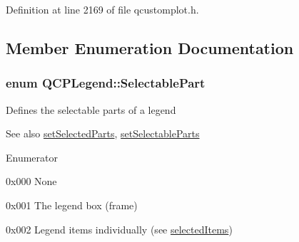Definition at line 2169 of file qcustomplot.\+h.



\subsection{Member Enumeration Documentation}
\hypertarget{class_q_c_p_legend_a5404de8bc1e4a994ca4ae69e2c7072f1}{}
\subsubsection[{Selectable\+Part}]{\setlength{\rightskip}{0pt plus 5cm}enum {\bf Q\+C\+P\+Legend\+::\+Selectable\+Part}}\label{class_q_c_p_legend_a5404de8bc1e4a994ca4ae69e2c7072f1}
Defines the selectable parts of a legend

\begin{DoxySeeAlso}{See also}
\hyperlink{class_q_c_p_legend_a2aee309bb5c2a794b1987f3fc97f8ad8}{set\+Selected\+Parts}, \hyperlink{class_q_c_p_legend_a9ce60aa8bbd89f62ae4fa83ac6c60110}{set\+Selectable\+Parts} 
\end{DoxySeeAlso}
\begin{Desc}
\item[Enumerator]\par
\begin{description}
\item[{\em 
\hypertarget{class_q_c_p_legend_a5404de8bc1e4a994ca4ae69e2c7072f1a378201c07d500af7126e3ec91652eed7}{}sp\+None\label{class_q_c_p_legend_a5404de8bc1e4a994ca4ae69e2c7072f1a378201c07d500af7126e3ec91652eed7}
}]{\ttfamily 0x000} None \item[{\em 
\hypertarget{class_q_c_p_legend_a5404de8bc1e4a994ca4ae69e2c7072f1a0fa4758962a46fa1dc9da818abae23c4}{}sp\+Legend\+Box\label{class_q_c_p_legend_a5404de8bc1e4a994ca4ae69e2c7072f1a0fa4758962a46fa1dc9da818abae23c4}
}]{\ttfamily 0x001} The legend box (frame) \item[{\em 
\hypertarget{class_q_c_p_legend_a5404de8bc1e4a994ca4ae69e2c7072f1a768bfb95f323db4c66473375032c0af7}{}sp\+Items\label{class_q_c_p_legend_a5404de8bc1e4a994ca4ae69e2c7072f1a768bfb95f323db4c66473375032c0af7}
}]{\ttfamily 0x002} Legend items individually (see \hyperlink{class_q_c_p_legend_ac93eaf236e911d67aa8b88942ef45c5e}{selected\+Items}) \end{description}
\end{Desc}



